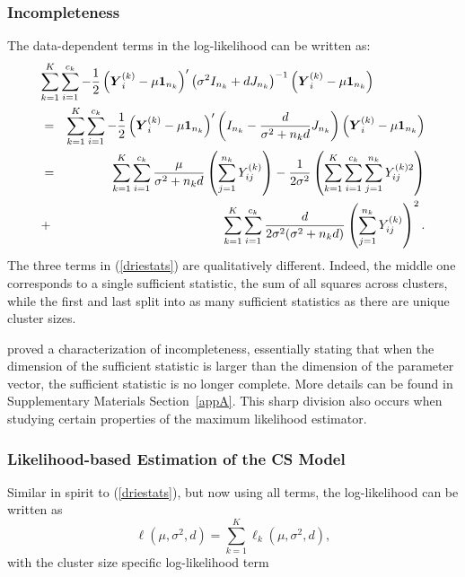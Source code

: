\documentclass[11pt,a5paper,twoside]{book}
\newcommand{\BY}{\mbox{\boldmath $Y$}}
\begin{document}
\subsubsection{Incompleteness}

The data-dependent terms in the log-likelihood can  be written as:
\begin{equation}
\label{driestats}
\begin{aligned}
\lefteqn{\sum_{k=1}^K\sum_{i=1}^{c_k}-\frac{1}{2}\left(\BY_i^{(k)}-\mu\mathbf{1}_{n_k}\right)'\left(\sigma^2I_{n_k}+dJ_{n_k}\right)^{-1}\left(\BY_i^{(k)}-\mu\mathbf{1}_{n_k}\right)}\\
&=&\sum_{k=1}^K\sum_{i=1}^{c_k}-\frac{1}{2}\left(\BY_i^{(k)}-\mu\mathbf{1}_{n_k}\right)'\left(I_{n_k}-\frac{d}{\sigma^2+n_kd}J_{n_k}\right)\left(\BY_i^{(k)}-\mu\mathbf{1}_{n_k}\right)\\
&=&
\sum_{k=1}^K\sum_{i=1}^{c_k}\frac{\mu}{\sigma^2+n_kd}\left(\sum_{j=1}^{n_k}Y_{ij}^{(k)}\right)
-\frac{1}{2\sigma^2}
\left(\sum_{k=1}^K\sum_{i=1}^{c_k}\sum_{j=1}^{n_k}Y_{ij}^{(k)2}\right)  \\
&+&
\sum_{k=1}^K\sum_{i=1}^{c_k}\frac{d}{2\sigma^2(\sigma^2+n_kd)}\left(
\sum_{j=1}^{n_k}Y_{ij}^{(k)}
\right)^2.
\end{aligned}
\end{equation}
The three terms in (\ref{driestats}) are qualitatively different. Indeed, the middle one corresponds to a single sufficient statistic, the sum of all squares across clusters, while the first and last split into as many sufficient statistics as there are unique cluster sizes.

\cite{Lisa2015_2} proved a characterization of incompleteness, essentially stating that when the dimension of the sufficient statistic is larger than the dimension of the parameter vector, the sufficient statistic is no longer complete. More details can be found in Supplementary Materials Section~\ref{appA}.
This sharp division also occurs when studying certain properties of the maximum likelihood estimator.

\subsubsection{Likelihood-based Estimation of the CS Model}
\label{likelihood}

Similar in spirit to (\ref{driestats}), but now using all terms, the log-likelihood can be written as
\begin{equation}
\label{loglikcs}
\ell(\mu,\sigma^2,d)=\sum_{k=1}^K\ell_k(\mu,\sigma^2,d),
\end{equation}
with the cluster size specific log-likelihood term
\end{document}
